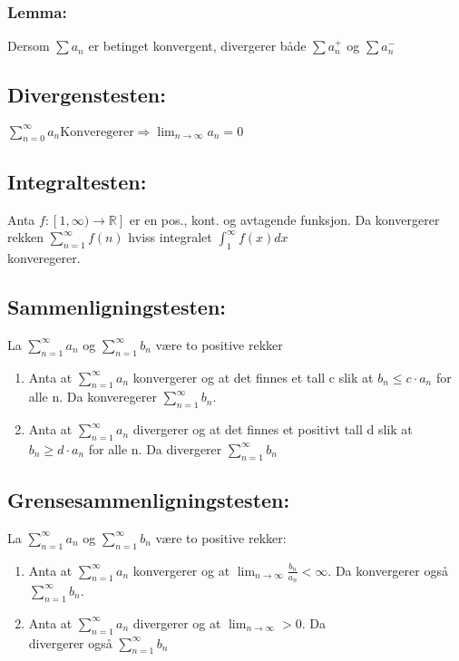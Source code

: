 \documentclass[8pt,a4paper,twocolumn,twoside]{article}
\def\real{\mathbb{R}}
\def\suminfty#1#2{\sum_{n=#1}^\infty #2}
\begin{document}
        \subsubsection*{Lemma:}
        Dersom $\sum a_n$ er betinget konvergent, divergerer både $\sum a_n^+$ og $\sum a_n^-$
        \subsection*{Divergenstesten:}
        $\sum_{n=0}^\infty a_n \text{Konveregerer} \Rightarrow \lim_{n\to\infty}a_n=0$
        \subsection*{Integraltesten:}
        Anta $f:[1,\infty)\to\real]$ er en pos., kont. og avtagende funksjon. Da konvergerer rekken $\sum_{n=1}^\infty f(n)$ hviss
        integralet $\int_1^\infty f(x)dx$ \\konveregerer.
        \subsection*{Sammenligningstesten:}
        La $\suminfty{1}{a_n}$ og $\suminfty{1}{b_n}$ være to positive rekker
        \begin{enumerate}
            \item Anta at $\suminfty{1}{a_n}$ konvergerer og at det finnes et tall c slik at $b_n \leq c\cdot a_n$ for alle n. Da konveregerer $\suminfty{1}{b_n}$.
            \item Anta at $\suminfty{1}{a_n}$ divergerer og at det finnes et positivt tall d slik at $b_n \geq d\cdot a_n$ for alle n. Da divergerer $\suminfty{1}{b_n}$
        \end{enumerate}
        \subsection*{Grensesammenligningstesten:}
        La $\suminfty{1}{a_n}$ og $\suminfty{1}{b_n}$ være to positive rekker:
        \begin{enumerate}
            \item Anta at $\suminfty{1}{a_n}$ konvergerer og at $\lim_{n\to\infty}\frac{b_n}{a_n}<\infty$. Da konvergerer også $\suminfty{1}{b_n}$.
            \item Anta at $\suminfty{1}{a_n}$ divergerer og at $\lim_{n\to\infty}>0$. Da \\divergerer også $\suminfty{1}{b_n}$
        \end{enumerate}
\end{document}
